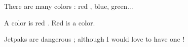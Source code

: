 There are many colors : %
red , blue, green... %

A color is red . %
Red is a color. 

Jetpaks are dangerous ; although I would love to have one ! %